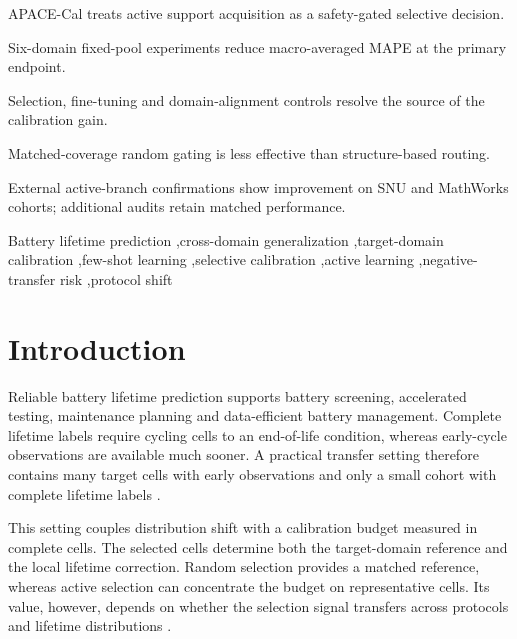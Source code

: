 \documentclass[preprint,12pt]{elsarticle}
\begin{document}
\begin{frontmatter}
\begin{highlights}
\item APACE-Cal treats active support acquisition as a safety-gated selective decision.
\item Six-domain fixed-pool experiments reduce macro-averaged MAPE at the primary endpoint.
\item Selection, fine-tuning and domain-alignment controls resolve the source of the calibration gain.
\item Matched-coverage random gating is less effective than structure-based routing.
\item External active-branch confirmations show improvement on SNU and MathWorks cohorts; additional audits retain matched performance.
\end{highlights}

\begin{keyword}
Battery lifetime prediction \sep cross-domain generalization \sep target-domain calibration \sep few-shot learning \sep selective calibration \sep active learning \sep negative-transfer risk \sep protocol shift
\end{keyword}

\end{frontmatter}

\section{Introduction}
\label{sec:introduction}

Reliable battery lifetime prediction supports battery screening, accelerated testing, maintenance planning and data-efficient battery management. Complete lifetime labels require cycling cells to an end-of-life condition, whereas early-cycle observations are available much sooner. A practical transfer setting therefore contains many target cells with early observations and only a small cohort with complete lifetime labels \citep{severson2019,paulson2022features,fei2021early,celik2022early,li2020digital,schmitt2023digital,pradhan2022review,vidal2020stateoftheart,ma2020elm,wang2026bayesian}.

This setting couples distribution shift with a calibration budget measured in complete cells. The selected cells determine both the target-domain reference and the local lifetime correction. Random selection provides a matched reference, whereas active selection can concentrate the budget on representative cells. Its value, however, depends on whether the selection signal transfers across protocols and lifetime distributions \citep{lu2023soh,liu2023transfer,vilsen2022field,zhang2025intercell,sun2024transfer,li2022healthconscious,roman2021pipeline,wang2024pinn}.
\end{document}

